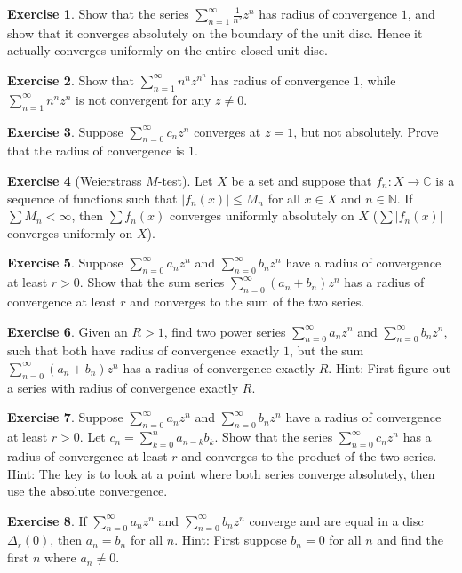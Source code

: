 \documentclass[12pt,openany]{book}
\newcommand{\sabs}[1]{\lvert {#1} \rvert}
\newcommand{\abs}[1]{\left\lvert {#1} \right\rvert}
\newcommand{\C}{{\mathbb{C}}}
\newcommand{\N}{{\mathbb{N}}}
\theoremstyle{plain}
\theoremstyle{remark}
\theoremstyle{definition}
\newenvironment{exbox}{%
    \def\FrameCommand{\vrule width 1pt \relax\hspace{10pt}}%
    \MakeFramed{\advance\hsize-\width\FrameRestore}%
}{%
    \endMakeFramed
}
\theoremstyle{exercise}
\newtheorem{exercise}{Exercise}[section]
\theoremstyle{example}
\begin{document}
\begin{exbox}
\begin{exercise}
Show that the series $\sum_{n=1}^\infty \frac{1}{n^2} z^{n}$ has radius of
convergence $1$, and
show that it converges absolutely on the boundary of the unit disc.  Hence
it actually converges uniformly on the entire closed unit disc.
\end{exercise}

\begin{exercise}
Show that
$\sum_{n=1}^\infty n^n z^{n^n}$ has radius of convergence $1$,
while
$\sum_{n=1}^\infty n^n z^{n}$ is not convergent 
for any $z \neq 0$.
\end{exercise}

\begin{exercise}
Suppose
$\sum_{n=0}^\infty c_n z^{n}$ converges at $z=1$, but not absolutely.
Prove that the radius of convergence is $1$.
\end{exercise}

\begin{exercise}[Weierstrass $M$-test]
\label{exercise:weierMtest}
Let $X$ be a set and suppose that $f_n \colon X \to \C$ is
a sequence of functions such that
$\abs{f_n(x)} \leq M_n$ for all $x \in X$ and $n \in \N$.  If $\sum M_n <
\infty$, then $\sum f_n(x)$ converges uniformly absolutely on $X$
($\sum \sabs{f_n(x)}$ converges uniformly on $X$).
\end{exercise}

\begin{exercise}
Suppose
$\sum_{n=0}^\infty a_n z^{n}$ and $\sum_{n=0}^\infty b_n z^{n}$
have a radius of convergence at least $r > 0$.  Show that
the sum series
$\sum_{n=0}^\infty (a_n+b_n) z^{n}$ has a radius of convergence at least
$r$ and converges to the sum of the two series.
\end{exercise}

\begin{exercise}
Given an $R > 1$, find two power series
$\sum_{n=0}^\infty a_n z^{n}$ and $\sum_{n=0}^\infty b_n z^{n}$,
such that both have radius of convergence exactly $1$, but the 
sum
$\sum_{n=0}^\infty (a_n+b_n) z^{n}$ has a radius of convergence 
exactly $R$.  Hint: First figure out a series with radius of convergence
exactly $R$.
\end{exercise}

\begin{exercise}
Suppose
$\sum_{n=0}^\infty a_n z^{n}$ and $\sum_{n=0}^\infty b_n z^{n}$
have a radius of convergence at least $r > 0$.  Let 
$c_n = \sum_{k=0}^n a_{n-k}b_k$.  Show that
the series
$\sum_{n=0}^\infty c_n z^{n}$ has a radius of convergence at least
$r$ and converges to the product of the two series.
Hint: The key is to look at a point where both series converge absolutely,
then use the absolute convergence.
\end{exercise}

\begin{exercise}
If $\sum_{n=0}^\infty a_n z^{n}$ and $\sum_{n=0}^\infty b_n z^{n}$
converge and are equal in a disc $\Delta_r(0)$, then $a_n = b_n$
for all $n$.  Hint: First suppose $b_n = 0$ for all $n$
and find the first $n$ where $a_n \neq 0$.
\end{exercise}
\end{exbox}
\end{document}

